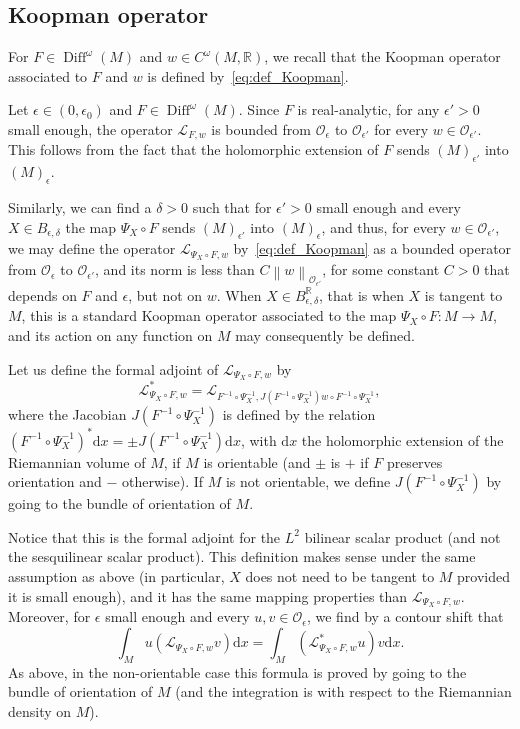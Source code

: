 \documentclass[10pt]{amsart}
\theoremstyle{definition}\newtheorem{defi}[theo]{Definition}\newtheorem{rema}[theo]{Remark}\newtheorem{exam}[theo]{Example}\newtheorem{exem}[theo]{Example}\newtheorem{nota}[theo]{Notation}
\DeclareMathOperator{\Diff}{Diff}
\newcommand{\n}[1]{\left\|#1\right\|}
\newcommand{\clO}{\mathcal{O}}
\newcommand{\clL}{\mathcal{L}}
\newcommand{\bbR}{\mathbb{R}}
\newcommand{\rmd}{\mathrm{d}}
\begin{document}
\subsection{Koopman operator}\label{subsection:koopman}

For $F \in \Diff^\omega(M)$ and $w \in C^\omega(M,\bbR)$, we recall that the Koopman operator associated to $F$ and $w$ is defined by~\eqref{eq:def_Koopman}.

Let $\epsilon \in (0,\epsilon_0)$ and $F \in \Diff^\omega(M)$. Since $F$ is real-analytic, for any $\epsilon'> 0$ small enough, the operator $\clL_{F,w}$ is bounded from $\clO_\epsilon$ to $\clO_{\epsilon'}$ for every $w \in \clO_{\epsilon'}$. This follows from the fact that the holomorphic extension of $F$ sends $(M)_{\epsilon'}$ into $(M)_\epsilon$.

Similarly, we can find a $\delta > 0$ such that for $\epsilon' > 0$ small enough and every $X \in B_{\epsilon,\delta}$ the map $\Psi_X \circ F$ sends $(M)_{\epsilon'}$ into $(M)_\epsilon$, and thus, for every $w \in \clO_{\epsilon'}$, we may define the operator $\clL_{\Psi_X \circ F,w}$ by~\eqref{eq:def_Koopman} as a bounded operator from $\clO_\epsilon$ to $\clO_{\epsilon'}$, and its norm is less than $C \n{w}_{\clO_{\epsilon'}}$, for some constant $C> 0$ that depends on $F$ and $\epsilon$, but not on $w$. When $X \in B_{\epsilon,\delta}^{\bbR}$, that is when $X$ is tangent to $M$, this is a standard Koopman operator associated to the map $\Psi_X \circ F : M \to M$, and its action on any function on $M$ may consequently be defined.

Let us define the formal adjoint of $\clL_{\Psi_X \circ F,w}$ by
\begin{equation*}
\clL_{\Psi_X \circ F,w}^* = \clL_{F^{-1} \circ \Psi_X^{-1}, J \left(F^{-1} \circ \Psi_X^{-1}\right) w \circ F^{-1} \circ \Psi_{X}^{-1}},
\end{equation*}
where the Jacobian $J(F^{-1} \circ \Psi_X^{-1})$ is defined by the relation $(F^{-1} \circ \Psi_X^{-1})^* \rmd x = \pm J(F^{-1} \circ \Psi_X^{-1}) \rmd x$, with $\rmd x$ the holomorphic extension of the Riemannian volume of $M$, if $M$ is orientable (and $\pm$ is $+$ if $F$ preserves orientation and $-$ otherwise). If $M$ is not orientable, we define $J(F^{-1} \circ \Psi_X^{-1})$ by going to the bundle of orientation of $M$.

Notice that this is the formal adjoint for the $L^2$ bilinear scalar product (and not the sesquilinear scalar product). This definition makes sense under the same assumption as above (in particular, $X$ does not need to be tangent to $M$ provided it is small enough), and it has the same mapping properties than $\clL_{\Psi_X \circ F,w}$. Moreover, for $\epsilon$ small enough and every $u,v \in \clO_\epsilon$, we find by a contour shift that
\begin{equation*}
\int_M u \left(\clL_{\Psi_X \circ F,w} v\right) \rmd x = \int_M \left(\clL_{\Psi_X \circ F,w}^* u\right) v \rmd x.
\end{equation*}
As above, in the non-orientable case this formula is proved by going to the bundle of orientation of $M$ (and the integration is with respect to the Riemannian density on $M$).
\end{document}
